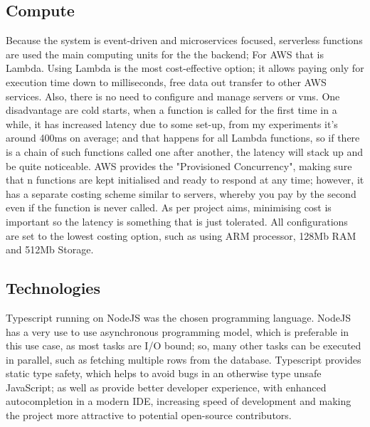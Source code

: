 \subsection{Compute}
Because the system is event-driven and microservices focused, serverless functions are used the main computing units for the the backend; For AWS that is Lambda. Using Lambda is the most cost-effective option; it allows paying only for execution time down to milliseconds, free data out transfer to other AWS services. Also, there is no need to configure and manage servers or vms. One disadvantage are cold starts, when a function is called for the first time in a while, it has increased latency due to some set-up, from my experiments it's around 400ms on average; and that happens for all Lambda functions, so if there is a chain of such functions called one after another, the latency will stack up and be quite noticeable. AWS provides the "Provisioned Concurrency", making sure that n functions are kept initialised and ready to respond at any time; however, it has a separate costing scheme similar to servers, whereby you pay by the second even if the function is never called. As per project aims, minimising cost is important so the latency is something that is just tolerated. All configurations are set to the lowest costing option, such as using ARM processor, 128Mb RAM and 512Mb Storage.
\subsection{Technologies}
Typescript running on NodeJS was the chosen programming language. NodeJS has a very use to use asynchronous programming model, which is preferable in this use case, as most tasks are I/O bound; so, many other tasks can be executed in parallel, such as fetching multiple rows from the database. Typescript provides static type safety, which helps to avoid bugs in an otherwise type unsafe JavaScript; as well as provide better developer experience, with enhanced autocompletion in a modern IDE, increasing speed of development and making the project more attractive to potential open-source contributors.
